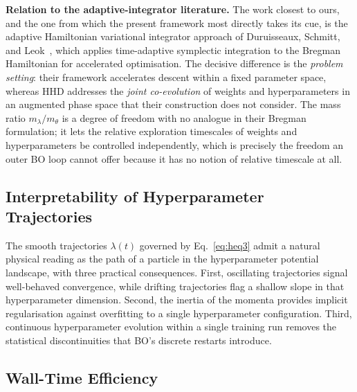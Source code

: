 \documentclass[11pt]{article}
\theoremstyle{definition}
\begin{document}
\textbf{Relation to the adaptive-integrator literature.} The work
closest to ours, and the one from which the present framework most
directly takes its cue, is the adaptive Hamiltonian variational
integrator approach of Duruisseaux, Schmitt, and
Leok~\cite{duruisseaux2021adaptive,duruisseaux2022variational},
which applies time-adaptive symplectic integration to the Bregman
Hamiltonian for accelerated optimisation. The decisive difference is
the \emph{problem setting}: their framework accelerates descent
within a fixed parameter space, whereas HHD addresses the
\emph{joint co-evolution} of weights and hyperparameters in an
augmented phase space that their construction does not consider. The
mass ratio $m_\lambda/m_\theta$ is a degree of freedom with no analogue
in their Bregman formulation; it lets the relative exploration
timescales of weights and hyperparameters be controlled
independently, which is precisely the freedom an outer BO loop cannot
offer because it has no notion of relative timescale at all.

\subsection{Interpretability of Hyperparameter Trajectories}

The smooth trajectories $\lambda(t)$ governed by Eq.~\eqref{eq:heq3}
admit a natural physical reading as the path of a particle in the
hyperparameter potential landscape, with three practical
consequences. First, oscillating trajectories signal well-behaved
convergence, while drifting trajectories flag a shallow slope in that
hyperparameter dimension. Second, the inertia of the momenta
provides implicit regularisation against overfitting to a single
hyperparameter configuration. Third, continuous hyperparameter
evolution within a single training run removes the statistical
discontinuities that BO's discrete restarts introduce.

\subsection{Wall-Time Efficiency}
\end{document}
